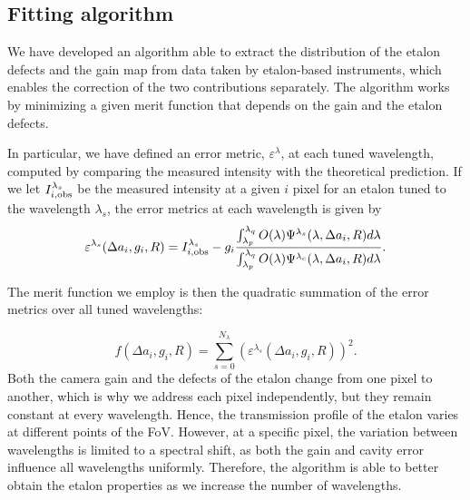 \subsection{\label{eta_corr_susec: fitting algorithm}Fitting algorithm}

We have developed an algorithm able to extract the distribution of the etalon defects and the gain map from data taken by etalon-based instruments, which enables the correction of the two contributions separately. The algorithm works by minimizing a given merit function that depends on the gain and the etalon defects. 

In particular, we have defined an error metric, $\varepsilon  ^\lambda$, at each tuned wavelength, computed by comparing the measured intensity with the theoretical prediction. If we let $I_ {i, {\rm obs}} ^{\lambda _s}$ be the measured intensity at a given $i$ pixel for an etalon tuned to the wavelength $\lambda_s$, the error metrics at each wavelength is given by
\begin{equation}
\varepsilon ^{\lambda _s} (\Delta a _i, g _ i, R) =  I _ {i, {\rm obs}} ^{\lambda _ s} - g_i \frac{\int_{\lambda_p}^{\lambda_q} O(\lambda)\Psi^{\lambda _ s} (\lambda, \Delta a _ i, R)  d\lambda}{\int_{\lambda_p}^{\lambda_q} O(\lambda)\Psi^{\lambda _ c} (\lambda, \Delta a _ i, R)  d\lambda}
\label{eq_eta_corr: Error metric}.
\end{equation}

The merit function we employ is then the quadratic summation of the error metrics over all tuned wavelengths:

\begin{equation}
f(\Delta a _i, g _ i, R) = \sum _ {s = 0} ^ {N_\lambda} \left( \varepsilon ^{\lambda _s} (\Delta a _i, g _ i, R) \right) ^ 2.  
\label{eq_eta_corr: Merit Function}
\end{equation}
Both the camera gain and the defects of the etalon change from one pixel to another, which is why we address each pixel independently, but they remain constant at every wavelength. Hence, the transmission profile of the etalon varies at different points of the FoV. However, at a specific pixel, the variation between wavelengths is limited to a spectral shift, as both the gain and cavity error influence all wavelengths uniformly. Therefore, the algorithm is able to better obtain the etalon properties as we increase the number of wavelengths.

